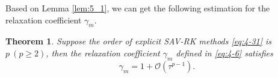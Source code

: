 \documentclass[preprint,compress,3p,10pt,fleqn]{elsarticle}
\numberwithin{equation}{section}
\newtheorem{theorem}{Theorem}[section]
\begin{document}

Based on Lemma \ref{lem:5_1}, we can get the following estimation for the relaxation coefficient $\gamma_m$.
	
\begin{theorem}\label{thm:5_1}
	Suppose the order of explicit SAV-RK methods \eqref{eq:4-31} is $p~(p \geq 2)$, then the relaxation coefficient $\gamma_m$ defined in \eqref{eq:4-6} satisfies
	\begin{equation}\label{eq:5_3}
	\gamma_m=1+\mathcal{O}(\tau^{p-1}).
	\end{equation}
	\end{theorem}	
	
\end{document}
